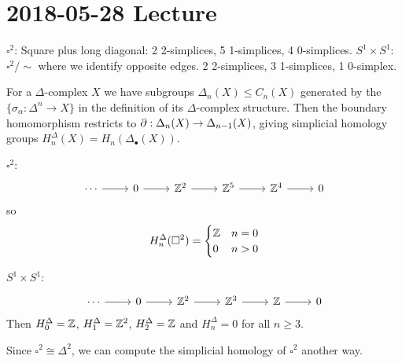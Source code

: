 \section{2018-05-28 Lecture}

\begin{exam}
  \lv
  \begin{enum}
    \io $\square^2$: Square plus long diagonal: 2 2-simplices, 5 1-simplices, 4 0-simplices.
    \io $S^1 \times S^1$: $\square^2/\sim$ where we identify opposite edges. 2 2-simplices, 3 1-simplices, 1 0-simplex.
  \end{enum}
\end{exam}

For a $\Delta$-complex $X$ we have subgroups $\Delta_n(X) \leq C_n(X)$ generated by the $\{ \sigma_\alpha: \Delta^n \to X \}$ in the definition of its $\Delta$-complex structure.
Then the boundary homomorphism restricts to $\partial: \Delta_n(X) \to \Delta_{n-1}(X)$, giving simplicial homology groups $H_n^\Delta(X) = H_n(\Delta_\bullet(X))$.

\begin{exam}
  \lv
  \begin{enum}
    \io
    $\square^2$:
    \begin{equation*}
      \begin{tikzcd}
	\cdots \ar[r] & 0 \ar[r] & \ZZ^2 \ar[r] & \ZZ^5 \ar[r] & \ZZ^4 \ar[r] & 0
      \end{tikzcd}
    \end{equation*}
    so
    \begin{equation*}
      H_n^\Delta(\square^2)=
      \begin{cases}
	\mathbb{Z} & n=0 \\
	0 & n>0
      \end{cases}
    \end{equation*}

    \io
    $S^1 \times S^1$:
    \begin{equation*}
      \begin{tikzcd}
	\cdots \ar[r] & 0 \ar[r] & \ZZ^2 \ar[r] & \ZZ^3 \ar[r] & \ZZ \ar[r] & 0
      \end{tikzcd}
    \end{equation*}
    Then $H_0^\Delta=\mathbb{Z}$, $H_1^\Delta=\mathbb{Z}^2$, $H_2^\Delta=\mathbb{Z}$ and $H_n^\Delta=0$ for all $n \geq 3$.
  \end{enum}
\end{exam}

\begin{rmk}
  Since $\square^2 \cong \Delta^2$, we can compute the simplicial homology of $\square^2$ another way.
\end{rmk}

